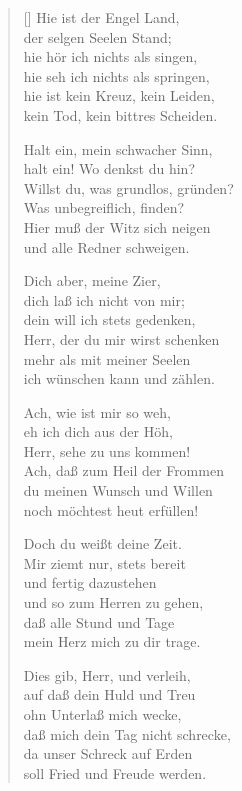 \begin{multicols}{2}
\begin{verse}[\versewidth]
 Hie ist der Engel Land,\\
der selgen Seelen Stand;\\
hie hör ich nichts als singen,\\
hie seh ich nichts als springen,\\
hie ist kein Kreuz, kein Leiden,\\
kein Tod, kein bittres Scheiden.

 Halt ein, mein schwacher Sinn,\\
halt ein! Wo denkst du hin?\\
Willst du, was grundlos, gründen?\\
Was unbegreiflich, finden?\\
Hier muß der Witz sich neigen\\
und alle Redner schweigen.

 Dich aber, meine Zier,\\
dich laß ich nicht von mir;\\
dein will ich stets gedenken,\\
Herr, der du mir wirst schenken\\
mehr als mit meiner Seelen\\
ich wünschen kann und zählen.

 Ach, wie ist mir so weh,\\
eh ich dich aus der Höh,\\
Herr, sehe zu uns kommen!\\
Ach, daß zum Heil der Frommen\\
du meinen Wunsch und Willen\\
noch möchtest heut erfüllen!

 Doch du weißt deine Zeit.\\
Mir ziemt nur, stets bereit\\
und fertig dazustehen\\
und so zum Herren zu gehen,\\
daß alle Stund und Tage\\
mein Herz mich zu dir trage.

 Dies gib, Herr, und verleih,\\
auf daß dein Huld und Treu\\
ohn Unterlaß mich wecke,\\
daß mich dein Tag nicht schrecke,\\
da unser Schreck auf Erden\\
soll Fried und Freude werden.

\end{verse}
\end{multicols}
